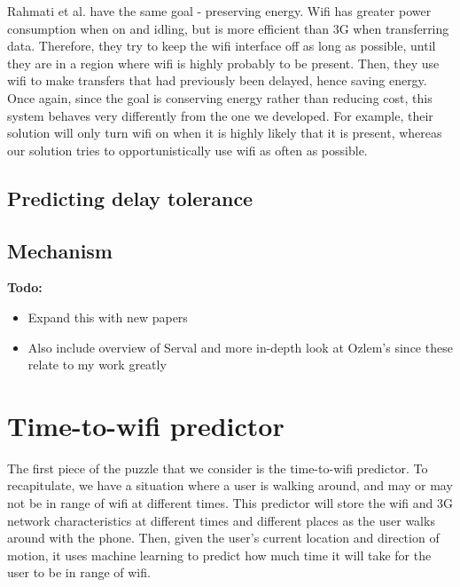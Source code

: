 \documentclass[12pt, fleqn]{article}
\begin{document}
Rahmati et al. have the same goal - preserving energy. Wifi has greater 
power consumption when on and idling, but is more efficient than 3G when 
transferring data. Therefore, they try to keep the wifi interface off as long as 
possible, until they are in a region where wifi is highly probably to be present. 
Then, they use wifi to make transfers that had previously been delayed, hence 
saving energy.\cite{rahmati-2007} Once again, since the goal is conserving 
energy rather than reducing cost, this system behaves very differently from the 
one we developed. For example, their solution will only turn wifi on when it is 
highly likely that it is present, whereas our solution tries to 
opportunistically use wifi as often as possible. 

\subsection{Predicting delay tolerance}
\label{related-work-dt}

\subsection{Mechanism}
\label{related-work-mechanism}


\bigskip
\textbf{Todo:}
\begin{itemize}
  \item Expand this with new papers
  \item Also include overview of Serval and more in-depth look at Ozlem's since 
  these relate to my work greatly
\end{itemize}




\section{Time-to-wifi predictor}
\label{time-to-wifi}


The first piece of the puzzle that we consider is the time-to-wifi predictor. To 
recapitulate, we have a situation where a user is walking around, and may or may
not be in range of wifi at different times. This predictor will store the wifi and 3G network characteristics 
at different times and different places as the user walks around with the 
phone. Then, given the user's current location and direction of motion, 
it uses machine learning to predict how much time it will take for the user to 
be in range of wifi. 
\end{document}
